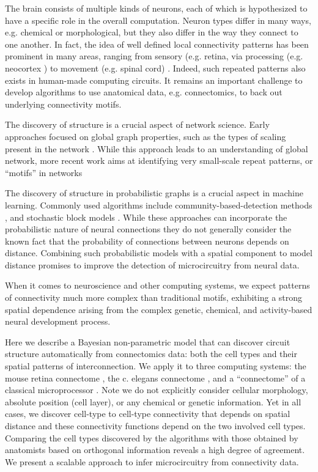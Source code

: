 \documentclass{article}
\begin{document}
The brain consists of multiple kinds of neurons, each of which is
hypothesized to have a specific role in the overall
computation. Neuron types differ in many ways, e.g. chemical or
morphological, but they also differ in the way they connect to one
another. In fact, the idea of well defined local connectivity patterns
has been prominent in many areas, ranging from sensory (e.g. retina,
\autocite{Masland2001} via processing (e.g. neocortex \autocite{Mountcastle1997})
to movement (e.g. spinal cord) \autocite{Grillner2005}. Indeed, such
repeated patterns also exists in human-made computing circuits. It
remains an important challenge to develop algorithms to use anatomical
data, e.g. connectomics, to back out underlying connectivity motifs.

The discovery of structure is a crucial aspect of network
science. Early approaches focused on global graph properties, such as
the types of scaling present in the network \autocite
{WattsStrogatz1998} .  While this approach leads to an understanding
of global network, more recent work aims at identifying very small-scale
repeat patterns, or “motifs” in networks\autocite{Milo2002}

The discovery of structure in probabilistic graphs is a crucial aspect
in machine learning. Commonly used algorithms include
community-based-detection methods \autocite{Girvan2002}, and
stochastic block models \autocite{Nowicki2001}.  While these
approaches can incorporate the probabilistic nature of neural
connections \autocite{Hill2012} they do not generally consider the
known fact that the probability of connections between neurons depends
on distance. Combining such probabilistic models with a spatial
component to model distance promises to improve the detection of
microcircuitry from neural data.

When it comes to neuroscience and other computing systems, we expect
patterns of connectivity much more complex than traditional motifs,
exhibiting a strong spatial dependence arising from the complex
genetic, chemical, and activity-based neural development process. 


Here we describe a Bayesian non-parametric model that can discover
circuit structure automatically from connectomics data: both the cell
types and their spatial patterns of interconnection. We apply it to
three computing systems: the mouse retina connectome
\autocite{Helmstaedter2013}, the c. elegans connectome
\autocite{White1986}, and a ``connectome'' of a classical
microprocessor \autocite{James2010}. Note we do not explicitly
consider cellular morphology, absolute position (cell layer), or any
chemical or genetic information. Yet in all cases, we discover
cell-type to cell-type connectivity that depends on spatial distance
and these connectivity functions depend on the two involved cell
types. Comparing the cell types discovered by the algorithms with
those obtained by anatomists based on orthogonal information reveals a
high degree of agreement. We present a scalable approach to infer
microcircuitry from connectivity data.
\end{document}
